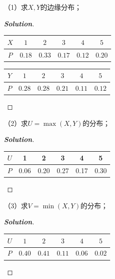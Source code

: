 \documentclass[10pt, a4paper, oneside]{ctexart}
\newenvironment{solution}{\begin{proof}[\bf Solution]}{\end{proof}}
\begin{document}
（1）求$X,Y$的边缘分布；
\begin{solution}
\begin{table}[ht]
    \centering
    \begin{tabular}{|c|c|c|c|c|c|} \hline 
         $X$&  $1$& $2$&$3$& $4$&$5$\\ \hline 
         $P$& 
     $0.18$& $0.33$& $0.17$& $0.12$&$0.20$\\ \hline\end{tabular}

\end{table}
    \begin{table}[ht]
    \centering
    \begin{tabular}{|c|c|c|c|c|c|} \hline 
         $Y$&  $1$& $2$&$3$& $4$&$5$\\ \hline 
         $P$& 
     $0.28$& $0.28$& $0.21$& $0.11$&$0.12$\\ \hline\end{tabular}

\end{table}

\end{solution}
（2）求$U=\max(X,Y)$的分布；
\begin{solution}
    
\begin{table}[H]
    \centering
    \begin{tabular}{|c|c|c|c|c|c|} \hline 
         $U$ & 1 & 2 & 3 & 4 & 5 \\ \hline 
         $P$ & 0.06 & 0.20 & 0.27 & 0.17 & 0.30 \\ \hline
    \end{tabular}
\end{table}

\end{solution}

（3）求$V=\min(X,Y)$的分布；

\begin{solution}
       \begin{table}[H]
    \centering
    \begin{tabular}{|c|c|c|c|c|c|} \hline 
         $U$&  $1$& $2$&$3$& $4$&$5$\\ \hline 
         $P$& 
     $0.40$& $0.41$& $0.11$& $0.06$&$0.02$\\ \hline\end{tabular}
\end{table}

\end{solution}
\end{document}
